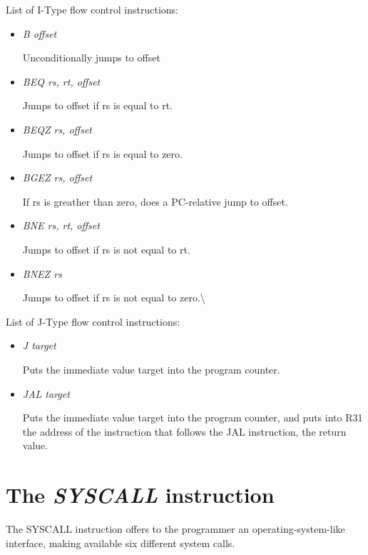 \documentclass[letterpaper,10pt,english]{sphinxmanual}
\begin{document}
List of I-Type flow control instructions:
\begin{itemize}
\item {} 
\emph{B offset}

Unconditionally jumps to offset

\item {} 
\emph{BEQ rs, rt, offset}

Jumps to offset if rs is equal to rt.

\item {} 
\emph{BEQZ rs, offset}

Jumps to offset if rs is equal to zero.

\end{itemize}
\begin{itemize}
\item {} 
\emph{BGEZ rs, offset}

If rs is greather than zero, does a PC-relative jump to offset.

\item {} 
\emph{BNE rs, rt, offset}

Jumps to offset if rs is not equal to rt.

\item {} 
\emph{BNEZ rs}

Jumps to offset if rs is not equal to zero.\textbackslash{}

\end{itemize}

List of J-Type flow control instructions:
\begin{itemize}
\item {} 
\emph{J target}

Puts the immediate value target into the program counter.

\item {} 
\emph{JAL target}

Puts the immediate value target into the program counter, and puts into R31 the address of the instruction that follows the JAL instruction, the return value.

\end{itemize}


\section{The \emph{SYSCALL} instruction}
\label{instructions:the-syscall-instruction}
The SYSCALL instruction offers to the programmer an operating-system-like
interface, making available six different system calls.
\end{document}
